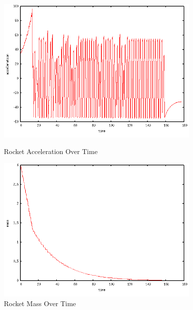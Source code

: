 \documentclass{article}
\begin{document}
\begin{figure}
\centering
\includegraphics[width=0.9\textwidth]{homework5a_acceleration.png}
\caption{Rocket Acceleration Over Time}
\vspace{2 cm}
\includegraphics[width=0.9\textwidth]{homework5a_mass.png}
\caption{Rocket Mass Over Time}
\end{figure}
\end{document}
